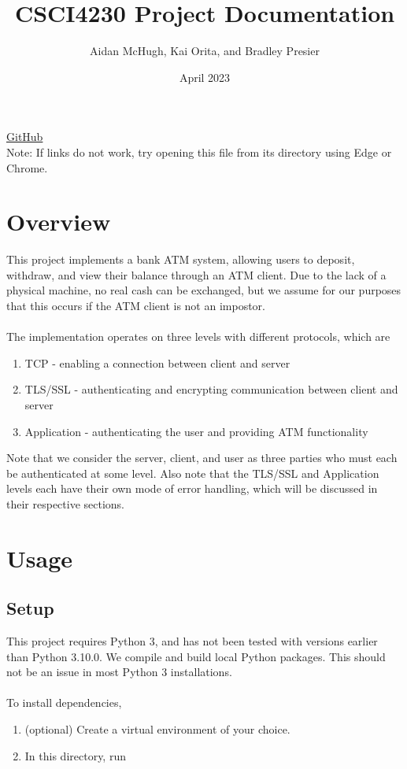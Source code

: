 \documentclass{article}
\title{CSCI4230 Project Documentation}
\author{Aidan McHugh, Kai Orita, and Bradley Presier}
\date{April 2023}
\newcommand{\code}[1]{\tcbox[
    on line,
    colback=codebackground, boxsep=2pt,
    colframe=white, boxrule=0pt,
    top=0pt, bottom=0pt, left=0pt, right=0pt
]{\texttt{#1}}}
\begin{document}
\begin{titlepage}
    \maketitle
    \begin{center}
        \href{https://github.com/2kai2kai2/CSCI4230-project}{GitHub \faGithub} \\
        \vspace*{30em}Note: If links do not work, try opening this file from its directory using Edge or Chrome.
    \end{center}
\end{titlepage}

\tableofcontents

\newpage
\section{Overview}
This project implements a bank ATM system, allowing users to deposit, withdraw, and view their balance through an ATM client.
Due to the lack of a physical machine, no real cash can be exchanged, but we assume for our purposes that this occurs if the ATM client is not an impostor. \\
\\
The implementation operates on three levels with different protocols, which are
\begin{enumerate}
    \item TCP - enabling a connection between client and server
    \item TLS/SSL - authenticating and encrypting communication between client and server
    \item Application - authenticating the user and providing ATM functionality
\end{enumerate}
Note that we consider the server, client, and user as three parties who must each be authenticated at some level.
Also note that the TLS/SSL and Application levels each have their own mode of error handling, which will be discussed in their respective sections.

\section{Usage}
\subsection{Setup}
This project requires Python 3, and has not been tested with versions earlier than Python 3.10.0.
We compile and build local Python packages. This should not be an issue in most Python 3 installations. \\
\\
To install dependencies,
\begin{enumerate}
    \item (optional) Create a virtual environment of your choice.
    \item In this directory, run \code{pip install -r requirements.txt}
\end{enumerate}
\end{document}
